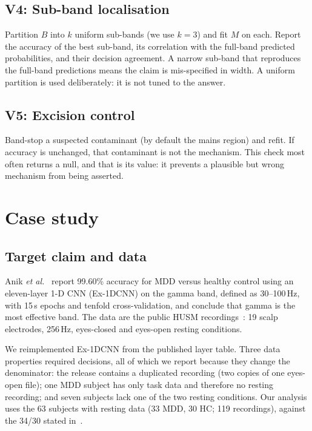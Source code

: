 \documentclass[10pt,conference]{IEEEtran}
\begin{document}
\subsection{V4: Sub-band localisation}
Partition $B$ into $k$ uniform sub-bands (we use $k=3$) and fit $M$ on each.
Report the accuracy of the best sub-band, its correlation with the full-band
predicted probabilities, and their decision agreement. A narrow sub-band that
reproduces the full-band predictions means the claim is mis-specified in width.
A uniform partition is used deliberately: it is not tuned to the answer.

\subsection{V5: Excision control}
Band-stop a suspected contaminant (by default the mains region) and refit. If
accuracy is unchanged, that contaminant is not the mechanism. This check most
often returns a null, and that is its value: it prevents a plausible but wrong
mechanism from being asserted.

\section{Case study}

\subsection{Target claim and data}
Anik \emph{et al.}~\cite{anik2024} report 99.60\% accuracy for MDD versus healthy
control using an eleven-layer 1-D CNN (Ex-1DCNN) on the gamma band, defined as
30--100\,Hz, with 15\,s epochs and tenfold cross-validation, and conclude that
gamma is the most effective band. The data are the public HUSM
recordings~\cite{mumtaz2017}: 19 scalp electrodes, 256\,Hz, eyes-closed and
eyes-open resting conditions.

We reimplemented Ex-1DCNN from the published layer table. Three data properties
required decisions, all of which we report because they change the denominator:
the release contains a duplicated recording (two copies of one eyes-open file);
one MDD subject has only task data and therefore no resting recording; and seven
subjects lack one of the two resting conditions. Our analysis uses the 63
subjects with resting data (33 MDD, 30 HC; 119 recordings), against the 34/30
stated in~\cite{anik2024}.
\end{document}
